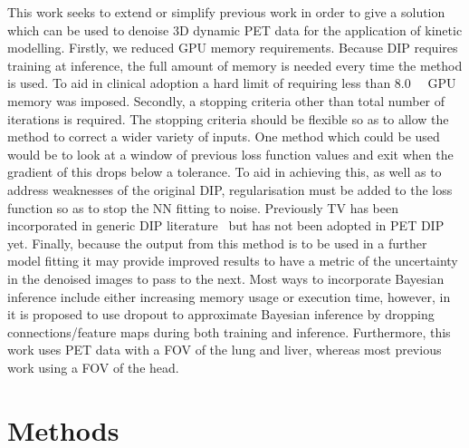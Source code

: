    This work seeks to extend or simplify previous work in order to give a solution which can be used to denoise \gls{3D} dynamic \gls{PET} data for the application of kinetic modelling. Firstly, we reduced \gls{GPU} memory requirements. Because \gls{DIP} requires training at inference,  the full amount of memory is needed every time the method is used. To aid in clinical adoption a hard limit of requiring less than \SI{8.0}{\giga\byte} \gls{GPU} memory was imposed. Secondly, a stopping criteria other than total number of iterations is required. The stopping criteria should be flexible so as to allow the method to correct a wider variety of inputs. One method which could be used would be to look at a window of previous loss function values and exit when the gradient of this drops below a tolerance. To aid in achieving this, as well as to address weaknesses of the original \gls{DIP}, regularisation must be added to the loss function so as to stop the \gls{NN} fitting to noise. Previously \gls{TV} has been incorporated in generic \gls{DIP} literature~\cite{Liu2019ImagePrior} but has not been adopted in \gls{PET} \gls{DIP} yet. Finally, because the output from this method is to be used in a further model fitting it may provide improved results to have a metric of the uncertainty in the denoised images to pass to the next. Most ways to incorporate Bayesian inference include either increasing memory usage or execution time, however, in~\cite{Gal2015DropoutLearning} it is proposed to use dropout to approximate Bayesian inference by dropping connections/feature maps during both training and inference. Furthermore, this work uses \gls{PET} data with a \gls{FOV} of the lung and liver, whereas most previous work using a \gls{FOV} of the head.


\section{Methods} \label{sec:methods}
        
    
